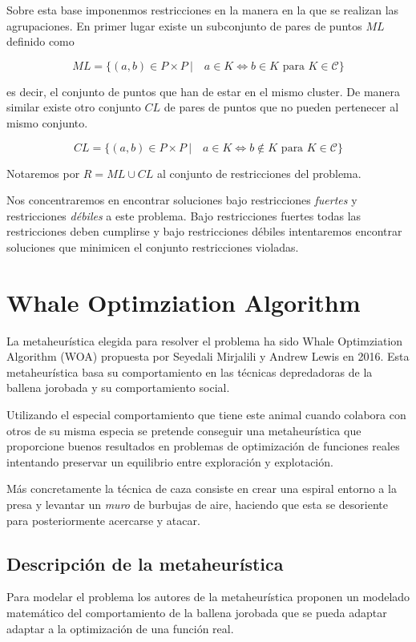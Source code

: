 \documentclass[a4paper,11pt]{article}
\begin{document}
Sobre esta base imponenmos restricciones en la manera en la que se
realizan las agrupaciones. En primer lugar existe un subconjunto de
pares de puntos $ML$ definido como

\[ ML = \{(a,b) \in P\times P\ | \quad a \in K \iff b\in K \text{ para } K \in \mathcal{C}\}\]

es decir, el conjunto de puntos que han de estar en el mismo
cluster. De manera similar existe otro conjunto $CL$ de pares de
puntos que no pueden pertenecer al mismo conjunto.

\[ CL = \{(a,b) \in P\times P\ | \quad a \in K \iff b\notin K \text{ para } K \in \mathcal{C}\}\]

Notaremos por $R = ML \cup CL$ al conjunto de restricciones del problema.

Nos concentraremos en encontrar soluciones bajo restricciones
\textit{fuertes} y restricciones \textit{débiles} a este
problema. Bajo restricciones fuertes todas las restricciones deben
cumplirse y bajo restricciones débiles intentaremos encontrar
soluciones que minimicen el conjunto restricciones violadas.

\section{Whale Optimziation Algorithm}

La metaheurística elegida para resolver el problema ha sido Whale Optimziation
Algorithm (WOA) propuesta por Seyedali Mirjalili y Andrew Lewis en 2016. Esta
metaheurística basa su comportamiento en las técnicas depredadoras de la ballena
jorobada y su comportamiento social. 

Utilizando el especial comportamiento que tiene este animal cuando colabora con 
otros de su misma especia se pretende conseguir una metaheurística que proporcione
buenos resultados en problemas de optimización de funciones reales intentando 
preservar un equilibrio entre exploración y explotación.

Más concretamente la técnica de caza consiste en crear una espiral entorno a la 
presa y levantar un \textit{muro} de burbujas de aire, haciendo que esta se desoriente
para posteriormente acercarse y atacar. 

\subsection{Descripción de la metaheurística}

Para modelar el problema los autores de la metaheurística proponen un modelado 
matemático del comportamiento de la ballena jorobada que se pueda adaptar adaptar 
a la optimización de una función real.
\end{document}
